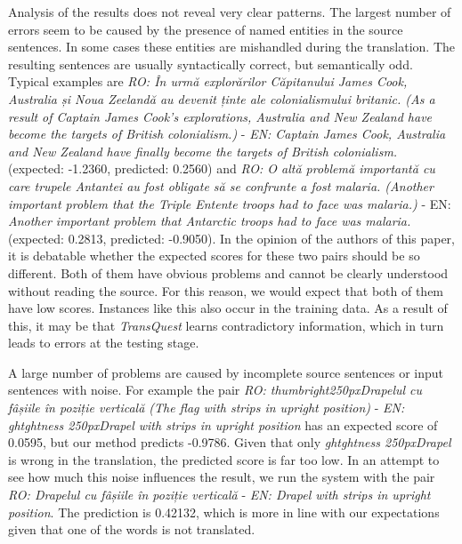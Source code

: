 Analysis of the results does not reveal very clear patterns. The largest number of errors seem to be caused by the presence of named entities in the source sentences. In some cases these entities are mishandled during the translation. The resulting sentences are usually syntactically correct, but semantically odd. Typical examples are \emph{RO: În urmă explorărilor Căpitanului James Cook, Australia și Noua Zeelandă au devenit ținte ale colonialismului britanic. (As a result of Captain James Cook's explorations, Australia and New Zealand have  become the targets of British colonialism.)} - \emph{EN: Captain James Cook, Australia and New Zealand have finally become the targets of British colonialism.} (expected: -1.2360, predicted: 0.2560) and \emph{RO: O altă problemă importantă cu care trupele Antantei au fost obligate să se confrunte a fost malaria. (Another important problem that the Triple Entente troops had to face was malaria.)} - EN: \emph{Another important problem that Antarctic troops had to face was malaria.} (expected: 0.2813, predicted: -0.9050). 
In the opinion of the authors of this paper, it is debatable whether the expected scores for these two pairs should be so different. Both of them have obvious problems and cannot be clearly understood without reading the source. For this reason, we would expect that both of them have low scores. Instances like this also occur in the training data. As a result of this, it may be that \textit{TransQuest} learns contradictory information, which in turn leads to errors at the testing stage.

A large number of problems are caused by incomplete source sentences or input sentences with noise. For example the pair \emph{RO: thumbright250pxDrapelul cu fâșiile în poziție verticală (The flag with strips in upright position)} -  \emph{EN: ghtghtness 250pxDrapel with strips in upright position} has an expected score of 0.0595, but our method predicts -0.9786. Given that only \emph{ghtghtness 250pxDrapel} is wrong in the translation, the predicted score is far too low. In an attempt to see how much this noise influences the result, we run the system with the pair \emph{RO: Drapelul cu fâșiile în poziție verticală} -  \emph{EN: Drapel with strips in upright position}. The prediction is 0.42132, which is more in line with our expectations given that one of the words is not translated. 

